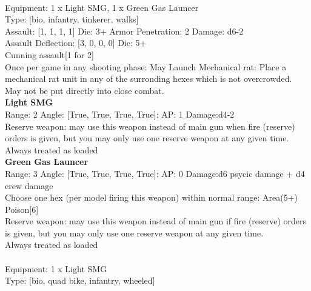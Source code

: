  \\
Equipment: 1 x Light SMG, 1 x Green Gas Launcer \\
Type: [bio, infantry, tinkerer, walks] \\

Assault: [1, 1, 1, 1] Die: 3+ Armor Penetration: 2 Damage: d6-2 \\
Assault Deflection: [3, 0, 0, 0] Die: 5+\\
\indent Cunning assault[1 for 2]\\ 
 

Once per game in any shooting phase: May Launch Mechanical rat: Place a mechanical rat unit in any of the surronding hexes which is not overcrowded. May not be put directly into close combat. \\ 


{\bf Light SMG } \\



Range: 2  Angle: [True, True, True, True]: AP: 1 Damage:d4-2 \\
Reserve weapon: may use this weapon instead of main gun when fire (reserve) orders is given, but you may only use one reserve weapon at any given time.\\ 
Always treated as loaded\\ 




{\bf Green Gas Launcer } \\



Range: 3  Angle: [True, True, True, True]: AP: 0 Damage:d6 psycic damage + d4 crew damage \\
Choose one hex (per model firing this weapon) within normal range: Area(5+)\\ 
Poison[6]\\ 
Reserve weapon: may use this weapon instead of main gun if fire (reserve) orders is given, but you may only use one reserve weapon at any given time.\\ 
Always treated as loaded\\ 




 



 \\
Equipment: 1 x Light SMG \\
Type: [bio, quad bike, infantry, wheeled] \\

